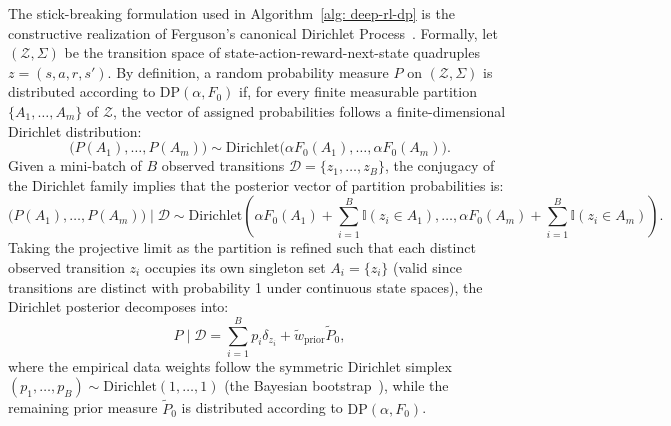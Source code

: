 \documentclass[10pt]{article}
\begin{document}
The stick-breaking formulation used in Algorithm~\ref{alg: deep-rl-dp} is the constructive realization of Ferguson's canonical Dirichlet Process~\citep{ferguson1973bayesian}. Formally, let $(\mathcal{Z}, \Sigma)$ be the transition space of state-action-reward-next-state quadruples $z = (s, a, r, s')$. By definition, a random probability measure $P$ on $(\mathcal{Z}, \Sigma)$ is distributed according to $\text{DP}(\alpha, F_0)$ if, for every finite measurable partition $\{A_1, \dots, A_m\}$ of $\mathcal{Z}$, the vector of assigned probabilities follows a finite-dimensional Dirichlet distribution:
\begin{equation}
\label{eq:dp-partition-definition}
\big(P(A_1), \dots, P(A_m)\big) \sim \mathrm{Dirichlet}\big(\alpha F_0(A_1), \dots, \alpha F_0(A_m)\big).
\end{equation}
Given a mini-batch of $B$ observed transitions $\mathcal{D} = \{z_1, \dots, z_B\}$, the conjugacy of the Dirichlet family implies that the posterior vector of partition probabilities is:
\begin{equation}
\label{eq:dp-partition-posterior}
\big(P(A_1), \dots, P(A_m)\big) \mid \mathcal{D} \sim \mathrm{Dirichlet}\left(\alpha F_0(A_1) + \sum_{i=1}^B \mathbb{I}(z_i \in A_1), \dots, \alpha F_0(A_m) + \sum_{i=1}^B \mathbb{I}(z_i \in A_m)\right).
\end{equation}
Taking the projective limit as the partition is refined such that each distinct observed transition $z_i$ occupies its own singleton set $A_i = \{z_i\}$ (valid since transitions are distinct with probability 1 under continuous state spaces), the Dirichlet posterior decomposes into:
\begin{equation}
P \mid \mathcal{D} = \sum_{i=1}^B p_i \delta_{z_i} + \tilde{w}_{\text{prior}} \tilde{P}_0,
\end{equation}
where the empirical data weights follow the symmetric Dirichlet simplex $(p_1, \dots, p_B) \sim \mathrm{Dirichlet}(1, \dots, 1)$ (the Bayesian bootstrap~\citep{rubin1981bayesian}), while the remaining prior measure $\tilde{P}_0$ is distributed according to $\text{DP}(\alpha, F_0)$.
\end{document}
